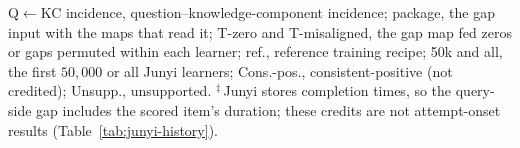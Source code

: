 \begin{table}[tbp]
\smallskip
\parbox{0.92\linewidth}{\scriptsize
Q$\leftarrow$KC incidence, question--knowledge-component incidence;
package, the gap input with the maps that read it; T-zero and
T-misaligned, the gap map fed zeros or gaps permuted within each
learner; ref., reference training recipe; 50k and all, the first
$50{,}000$ or all Junyi learners; Cons.-pos., consistent-positive (not credited);
Unsupp., unsupported.
$^{\ddagger}$\,Junyi stores completion times, so the query-side gap
includes the scored item's duration; these credits are not
attempt-onset results (Table~\ref{tab:junyi-history}).
}
\end{table}

